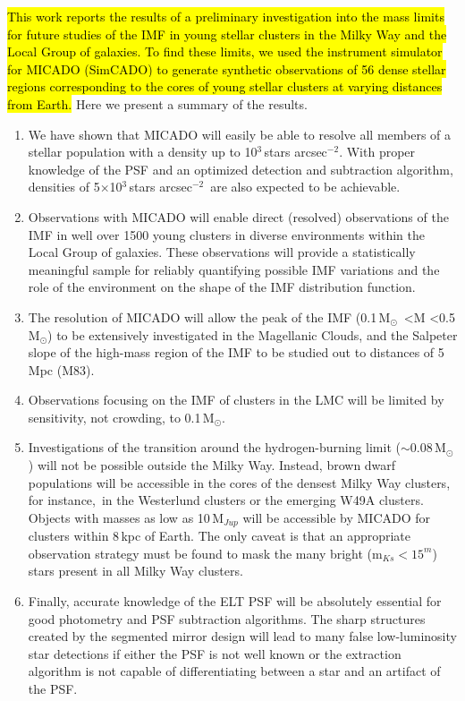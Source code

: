 \documentclass{aa}
\newcommand{\msun}{M$_\odot$~}
\newcommand{\msune}{M$_\odot$}
\newcommand{\s}{$\sim$}
\newcommand{\h}[1]{$^{#1}$}
\newcommand{\spa}{stars arcsec$^{-2}$~}
\newcommand{\spae}{stars arcsec$^{-2}$}
\begin{document}
\hl{This work reports the results of a preliminary investigation into the mass limits for future studies of the IMF in young stellar clusters in the Milky Way and the Local Group of galaxies.
To find these limits, we used the instrument simulator for MICADO (SimCADO) to generate synthetic observations of 56 dense stellar regions corresponding to the cores of young stellar clusters at varying distances from Earth.}
Here we present a summary of the results.

\begin{enumerate}
    \item We have shown that MICADO will easily be able to resolve all members of a stellar population with a density up to 10\h3\,\spae.
    With proper knowledge of the PSF and an optimized detection and subtraction algorithm, densities of 5$\times$10\h3\,\spa are also expected to be achievable.

    \item Observations with MICADO will enable direct (resolved) observations of the IMF in well over 1500 young clusters in diverse environments within the Local Group of galaxies.
    These observations will provide a statistically meaningful sample for reliably quantifying possible IMF variations and the role of the environment on the shape of the IMF distribution function.

    \item The resolution of MICADO will allow the peak of the IMF (0.1\,\msun\textless M \textless0.5\,\msune) to be extensively investigated in the Magellanic Clouds, and the Salpeter slope of the high-mass region of the IMF to be studied out to distances of 5\,Mpc (M83).

    \item Observations focusing on the IMF of clusters in the LMC will be limited by sensitivity, not crowding, to 0.1\,\msune.

    \item Investigations of the transition around the hydrogen-burning limit (\s0.08\,\msune) will not be possible outside the Milky Way.
    Instead, brown dwarf populations will be accessible in the cores of the densest Milky Way clusters, for instance,\ in the Westerlund clusters or the emerging W49A clusters.
    Objects with masses as low as 10\,M$_{Jup}$ will be accessible by MICADO for clusters within 8\,kpc of Earth.
    The only caveat is that an appropriate observation strategy must be found to mask the many bright (m$_{Ks}<15^m$) stars present in all Milky Way clusters.

    \item Finally, accurate knowledge of the ELT PSF will be absolutely essential for good photometry and PSF subtraction algorithms.
    The sharp structures created by the segmented mirror design will lead to many false low-luminosity star detections if either the PSF is not well known or the extraction algorithm is not capable of differentiating between a star and an artifact of the PSF\@.

\end{enumerate}
\end{document}
